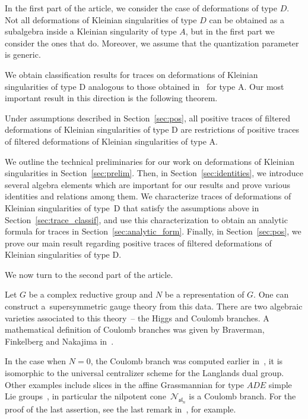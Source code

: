 \documentclass[pdftex]{sigma}
\newcommand{\mc}{\mathcal}
\numberwithin{equation}{section}
\theoremstyle{definition}
\begin{document}
In the first part of the article, we consider the case of deformations of type $D$.
Not all deformations of Kleinian singularities of type $D$ can be obtained as a subalgebra inside a Kleinian singularity of type $A$, but in the first part we consider the ones that do. Moreover, we assume that the quantization parameter is generic.

We obtain classification results for traces
on deformations of Kleinian singularities of type D
analogous to those obtained in~\cite{etingof2021twisted} for type A.
Our most important result in this direction is the following theorem.

\begin{theorem*}
 Under assumptions described in Section~{\rm\ref{sec:pos}},
 all positive traces of filtered deformations of Kleinian singularities
 of type D
 are restrictions of positive traces
 of filtered deformations of Kleinian singularities of type A.
\end{theorem*}

We outline the technical preliminaries for our work on deformations of Kleinian singularities
in Section~\ref{sec:prelim}.
Then, in Section~\ref{sec:identities},
we introduce several algebra elements
which are important for our results
and prove various identities and relations among them.
We characterize traces of deformations
of Kleinian singularities of type~D
that satisfy the assumptions above in Section~\ref{sec:trace_classif},
and use this characterization
to obtain an analytic formula for traces
in Section~\ref{sec:analytic_form}.
Finally, in Section~\ref{sec:pos}, we prove our main result
regarding positive traces
of filtered deformations of Kleinian singularities of type D.

We now turn to the second part of the article.

Let $G$ be a complex reductive group and $N$ be a representation of $G$. One can construct a~supersymmetric gauge theory from this data. There are two algebraic varieties associated to this theory~-- the Higgs and Coulomb branches. A mathematical definition of Coulomb branches was given by Braverman, Finkelberg and Nakajima in~\cite{BFN}.

In the case when $N=0$, the Coulomb branch was computed earlier in~\cite{BFM}, it is isomorphic to the universal centralizer scheme  for the Langlands dual group. Other examples include slices in the affine Grassmannian for type $ADE$ simple Lie groups~\cite{BFNQuivers}, in particular the nilpotent cone~$\mc{N}_{\mathfrak{sl}_n}$ is a Coulomb branch. For the proof of the last assertion, see the last remark in~\cite{GW}, for example.
\end{document}
